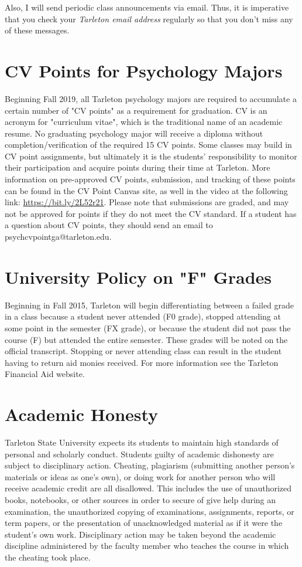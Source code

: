 \documentclass[10pt]{article}
\begin{document}
Also, I will send periodic class announcements via email.  Thus, it is imperative that you check your \emph{Tarleton email address} regularly so that you don't miss any of these messages.

\section*{CV Points for Psychology Majors}
\label{sec:org5526630}
Beginning Fall 2019, all Tarleton psychology majors are required to accumulate a certain number of "CV points" as a requirement for graduation. CV is an acronym for "curriculum vitae", which is the traditional name of an academic resume.  No graduating psychology major will receive a diploma without completion/verification of the required 15 CV points. Some classes may build in CV point assignments, but ultimately it is the students’ responsibility to monitor their participation and acquire points during their time at Tarleton.  More information on pre-approved CV points, submission, and tracking of these points can be found in the CV Point Canvas site, as well in the video at the following link: \url{https://bit.ly/2L52r21}. Please note that submissions are graded, and may not be approved for points if they do not meet the CV standard.  If a student has a question about CV points, they should send an email to psychcvpointga@tarleton.edu.

\section*{University Policy on "F" Grades}
\label{sec:org4d37c0f}
Beginning in Fall 2015, Tarleton will begin differentiating between a failed grade in a class because a student never attended (F0 grade), stopped attending at some point in the semester (FX grade), or because the student did not pass the course (F) but attended the entire semester. These grades will be noted on the official transcript. Stopping or never attending class can result in the student having to return aid monies received.  For more information see the Tarleton Financial Aid website.

\section*{Academic Honesty}
\label{sec:org3c6ea52}

Tarleton State University expects its students to maintain high standards of personal and scholarly conduct. Students guilty of academic dishonesty are subject to disciplinary action. Cheating, plagiarism (submitting another person’s materials or ideas as one’s own), or doing work for another person who will receive academic credit are all disallowed. This includes the use of unauthorized books, notebooks, or other sources in order to secure of give help during an examination, the unauthorized copying of examinations, assignments, reports, or term papers, or the presentation of unacknowledged material as if it were the student’s own work. Disciplinary action may be taken beyond the academic discipline administered by the faculty member who teaches the course in which the cheating took place.
\end{document}
